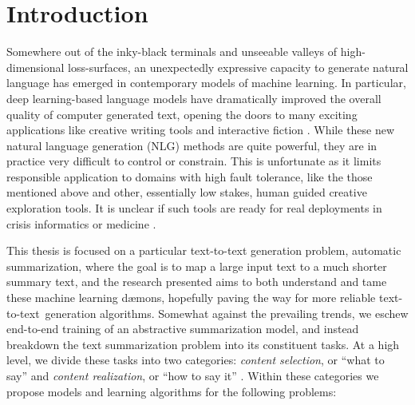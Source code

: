 \chapter{Introduction}



\addvspace{6\bigskipamount}

\startglyph Somewhere out of
the inky-black terminals and  unseeable valleys of high-dimensional
loss-surfaces, an unexpectedly expressive capacity to generate natural
language has emerged in contemporary models of machine learning.
In particular, deep learning-based language models have dramatically improved
the overall quality of computer generated text, opening the doors to many
exciting applications like creative writing tools
\citep{huggingface2019,samuel2019,seabrook2019} and interactive fiction
\citep{robertson2019}.  While these new natural language generation (NLG)
methods are quite powerful, they are in practice very difficult to control or
constrain. This is unfortunate as it limits responsible application to domains
with high fault tolerance, like the those mentioned above and other,
essentially low stakes, human guided creative exploration tools. It is unclear
if such tools are ready for real deployments in crisis informatics
\citep{starbird2013} or medicine \citep{gatt2009}.

This thesis is focused on a particular text-to-text generation problem,
automatic summarization, where the goal is to map a large input text to a much
shorter summary text, and the research presented aims to both understand and
tame these machine learning d{\ae}mons, hopefully paving the way for more
reliable text-to-text~generation algorithms.  Somewhat against the prevailing
trends, we eschew end-to-end training of an abstractive summarization model,
and instead breakdown the text summarization problem into its constituent
tasks.  At a high level, we divide these tasks into two categories:
\textit{content selection}, or ``what to say'' and \textit{content
realization}, or ``how to say it'' \citep{mckeown1985}.  Within these
categories we propose models and learning algorithms for the following
problems:
    
